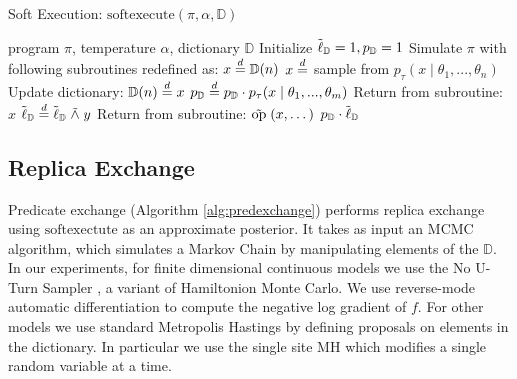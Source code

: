 \begin{algorithm}[tb]
  \caption{Soft Execution: $\textrm{softexecute}(\pi, \alpha, \mathbb{D})$}
  \label{alg:softexecute}
\begin{algorithmic}
 program $\pi$, temperature $\alpha$, dictionary $\mathbb{D}$
\STATE Initialize $\tilde{\operatorname{\ell}}_\mathbb{D} = 1, p_\mathbb{D} = 1$
\STATE Simulate $\pi$ with following subroutines redefined as:   
   \STATE $x \stackrel {d}{=} \mathbb{D}(n)$
 \ELSE
   \STATE $x \stackrel {d}{=} $ sample from $p_\tau(x \mid \theta_1, ..., \theta_n)$
   \STATE Update dictionary: $\mathbb{D}(n) \stackrel {d}{=} x$
 \ENDIF
 \STATE $p_\mathbb{D} \stackrel {d}{=} p_\mathbb{D} \cdot p_\tau(x \mid \theta_1, ..., \theta_m)$
 \STATE Return from subroutine: $x$
\ENDALOOP
\STATE
{}
  \STATE $\tilde{\operatorname{\ell}}_\mathbb{D} \stackrel {d}{=} \tilde{\operatorname{\ell}}_\mathbb{D} \mathrel{\tilde{\land}} y$
\ENDALOOP
\STATE
{}
  \STATE Return from subroutine: $\mathrel{\tilde{\textrm{op}}}(x, \dots)$ 
\ENDALOOP
\STATE
{} $p_\mathbb{D} \cdot \tilde{\operatorname{\ell}}_\mathbb{D}$
\end{algorithmic}
\end{algorithm}

\subsection{Replica Exchange}

Predicate exchange (Algorithm \ref{alg:predexchange}) performs replica exchange using $\textrm{softexectute}$ as an approximate posterior.
It takes as input an MCMC algorithm, which simulates a Markov Chain by manipulating elements of the $\mathbb{D}$.
In our experiments, for finite dimensional continuous models we use the No U-Turn Sampler \cite{hoffman2014no}, a variant of Hamiltonion Monte Carlo.
We use reverse-mode automatic differentiation \cite{griewank2008evaluating} to compute the negative log gradient of $f$.
For other models we use standard Metropolis Hastings by defining proposals on elements in the dictionary.
In particular we use the single site MH \cite{wingate2011lightweight} which modifies a single random variable at a time.

